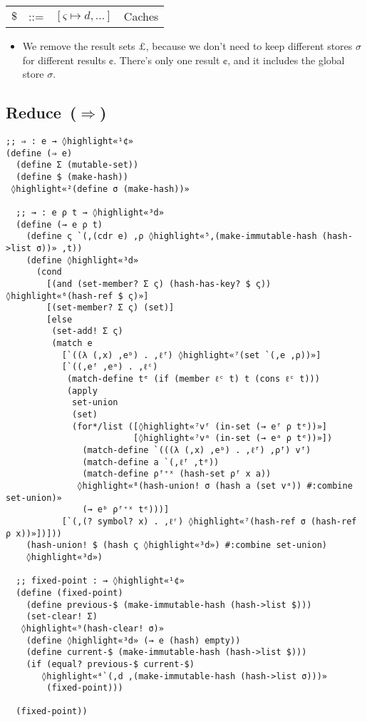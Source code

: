\documentclass[12pt, oneside]{book}
\begin{document}
\begin{tabular}{rcll}
  \(\$\) & ::= & \([ς ↦ d, ...]\) & Caches \\
\end{tabular}

\begin{itemize}
  \item We remove the result sets \(£\), because we don’t need to keep different stores \(σ\) for different results \(¢\). There’s only one result \(¢\), and it includes the global store \(σ\).
\end{itemize}

\subsection{Reduce~(\(⇒\))}

\begin{Verbatim}
;; ⇒ : e → ◊highlight«¹¢»
(define (⇒ e)
  (define Σ (mutable-set))
  (define $ (make-hash))
 ◊highlight«²(define σ (make-hash))»

  ;; → : e ρ t → ◊highlight«³d»
  (define (→ e ρ t)
    (define ς `(,(cdr e) ,ρ ◊highlight«⁵,(make-immutable-hash (hash->list σ))» ,t))
    (define ◊highlight«³d»
      (cond
        [(and (set-member? Σ ς) (hash-has-key? $ ς)) ◊highlight«⁶(hash-ref $ ς)»]
        [(set-member? Σ ς) (set)]
        [else
         (set-add! Σ ς)
         (match e
           [`((λ (,x) ,eᵇ) . ,ℓᶠ) ◊highlight«⁷(set `(,e ,ρ))»]
           [`((,eᶠ ,eᵃ) . ,ℓᶜ)
            (match-define tᵉ (if (member ℓᶜ t) t (cons ℓᶜ t)))
            (apply
             set-union
             (set)
             (for*/list ([◊highlight«⁷vᶠ (in-set (→ eᶠ ρ tᵉ))»]
                         [◊highlight«⁷vᵃ (in-set (→ eᵃ ρ tᵉ))»])
               (match-define `(((λ (,x) ,eᵇ) . ,ℓᶠ) ,ρᶠ) vᶠ)
               (match-define a `(,ℓᶠ ,tᵉ))
               (match-define ρᶠ⁺ˣ (hash-set ρᶠ x a))
              ◊highlight«⁸(hash-union! σ (hash a (set vᵃ)) #:combine set-union)»
               (→ eᵇ ρᶠ⁺ˣ tᵉ)))]
           [`(,(? symbol? x) . ,ℓʳ) ◊highlight«⁷(hash-ref σ (hash-ref ρ x))»])]))
    (hash-union! $ (hash ς ◊highlight«³d») #:combine set-union)
    ◊highlight«³d»)

  ;; fixed-point : → ◊highlight«¹¢»
  (define (fixed-point)
    (define previous-$ (make-immutable-hash (hash->list $)))
    (set-clear! Σ)
   ◊highlight«⁹(hash-clear! σ)»
    (define ◊highlight«³d» (→ e (hash) empty))
    (define current-$ (make-immutable-hash (hash->list $)))
    (if (equal? previous-$ current-$)
       ◊highlight«⁴`(,d ,(make-immutable-hash (hash->list σ)))»
        (fixed-point)))

  (fixed-point))
\end{Verbatim}
\end{document}
